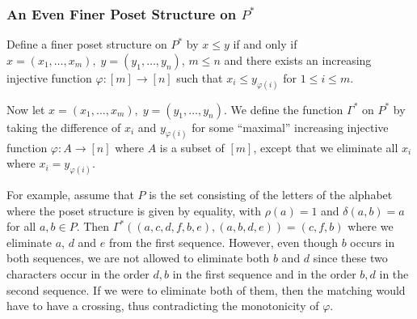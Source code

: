 \documentclass[acmsmall,review,anonymous]{acmart}\settopmatter{printfolios=true,printccs=false,printacmref=false}
\begin{document}
\subsubsection{An Even Finer Poset Structure on $P^*$}\label{nocrossing}
Define a finer poset structure on $P^*$ by $x \leq y$ if
and only if $x = (x_1, \ldots, x_m), \; y = (y_1, \ldots, y_n)$, $m \leq n$ and
there exists an increasing injective function $\varphi : [m] \longrightarrow
[n]$ such that $x_i \leq y_{\varphi(i)}$ for $1 \leq i \leq m$.

Now let $x = (x_1, \ldots, x_m), \; y = (y_1, \ldots, y_n)$. We define the
function $\Gamma^*$ on $P^*$ by taking the difference of $x_i$ and
$y_{\varphi(i)}$ for some ``maximal'' increasing injective function $\varphi :
A \longrightarrow [n]$ where $A$ is a subset of $[m]$, except that we eliminate
all $x_i$ where $x_i = y_{\varphi(i)}$.

For example, assume that $P$ is the set consisting of the letters of the
alphabet where the poset structure is given by equality, with $\rho(a) = 1$
and $\delta(a, b) = a$ for all $a, b \in P$. Then $\Gamma^*((a, c, d, f, b, e),
(a, b, d, e)) = (c, f, b)$ where we eliminate $a$, $d$ and $e$ from the first
sequence. However, even though $b$ occurs in both sequences, we are not allowed
to eliminate both $b$ and $d$ since these two characters occur in the order $d,
b$ in the first sequence and in the order $b, d$ in the second sequence. If we
were to eliminate both of them, then the matching would have to have a
crossing, thus contradicting the monotonicity of $\varphi$.
\end{document}
